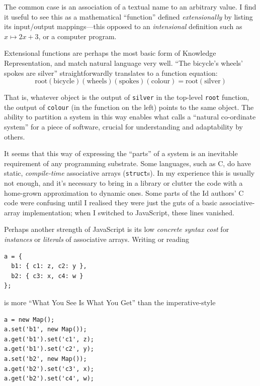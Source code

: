 The common case is an association of a textual name to an arbitrary
value. I find it useful to see this as a mathematical ``function''
defined \emph{extensionally} by listing its input/output mappings---this
opposed to an \emph{intensional} definition such as \(x \mapsto 2x+3\),
or a computer program.

Extensional functions are perhaps the most basic form of Knowledge
Representation, and match natural language very well. ``The bicycle's
wheels' spokes are silver'' straightforwardly translates to a function
equation: \begin{equation*}
\mathrm{root} (\mathrm{bicycle}) (\mathrm{wheels}) (\mathrm{spokes}) (\mathrm{colour}) = \mathrm{root} (\mathrm{silver})
\end{equation*}

That is, whatever object is the output of \texttt{silver} in the
top-level \texttt{root} function, the output of \texttt{colour} (in the
function on the left) points to the same object. The ability to
partition a system in this way enables what \cite{externalise} calls a
``natural co-ordinate system'' for a piece of software, crucial for
understanding and adaptability by others.

It seems that this way of expressing the ``parts'' of a system is an
inevitable requirement of any programming substrate. Some languages,
such as C, do have static, \emph{compile-time} associative arrays
(\texttt{struct}s). In my experience this is usually not enough, and
it's necessary to bring in a library or clutter the code with a
home-grown approximation to dynamic ones. Some parts of the Id{}
authors' C code were confusing until I realised they were just the guts
of a basic associative-array implementation; when I switched to
JavaScript, these lines vanished.

Perhaps another strength of JavaScript is its low \emph{concrete syntax
cost} for \emph{instances} or \emph{literals} of associative arrays.
Writing or reading

\begin{lstlisting}
a = {
  b1: { c1: z, c2: y },
  b2: { c3: x, c4: w }
};
\end{lstlisting}

is more ``What You See Is What You Get'' than the imperative-style

\begin{lstlisting}
a = new Map();
a.set('b1', new Map());
a.get('b1').set('c1', z);
a.get('b1').set('c2', y);
a.set('b2', new Map());
a.get('b2').set('c3', x);
a.get('b2').set('c4', w);
\end{lstlisting}

